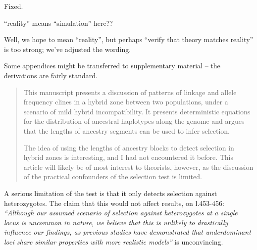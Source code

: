 \reply
Fixed.

\begin{point}{\revref}
``reality'' means ``simulation'' here??
\end{point}

\reply
Well, we hope to mean ``reality'', but perhaps ``verify that theory matches reality'' is too strong; we've adjusted the wording.

\begin{point}{}
 Some appendices might be transferred to supplementary material -- the derivations are fairly standard.
\end{point}

\reply
{}




\begin{quote}
    This manuscript presents a discussion of patterns of linkage and allele frequency clines in a hybrid zone between two populations, under a scenario of mild hybrid incompatibility. It presents deterministic equations for the distribution of ancestral haplotypes along the genome and argues that the lengths of ancestry segments can be used to infer selection.

    The idea of using the lengths of ancestry blocks to detect selection in hybrid zones is interesting, and I had not encountered it before. This article will likely be of most interest to theorists, however, as the discussion of the practical confounders of the selection test is limited. 
\end{quote}

\begin{point}{}
    A serious limitation of the test is that it only detects selection against heterozygotes. The claim that this would not affect results, on l.453-456:
    \textit{``Although our assumed scenario of selection against heterozygotes at a single locus is uncommon in nature, we believe that this is unlikely to drastically influence our findings, as previous studies have demonstrated that underdominant loci share similar properties with more realistic models''}
    is unconvincing.
\end{point}

\reply
{}

